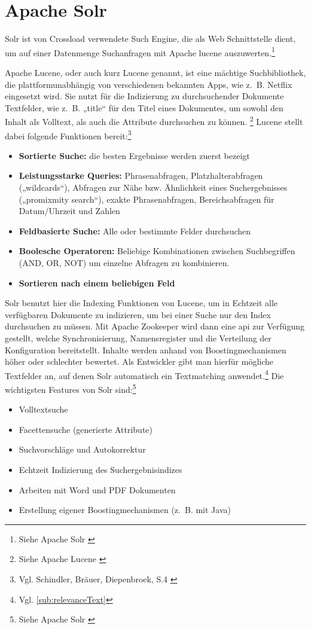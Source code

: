 \clearpage
\section{Apache Solr}
\label{sec:Solr}
Solr ist von Crossload verwendete Such Engine, die als Web Schnittstelle dient, um auf einer Datenmenge Suchanfragen mit Apache \gls{lucene} auszuwerten.\footnote{Siehe Apache Solr \cite{solr2022}}

Apache Lucene, oder auch kurz Lucene genannt, ist eine mächtige Suchbibliothek, die plattformunabhängig von verschiedenen bekannten Apps, wie z. B. Netflix eingesetzt wird.
Sie nutzt für die Indizierung zu durchsuchender Dokumente Textfelder, wie z. B. „title“ für den Titel eines Dokumentes, um sowohl den Inhalt als Volltext, als auch die Attribute durchsuchen zu können. \footnote{Siehe Apache Lucene \cite{lucene2022}}
Lucene stellt dabei folgende Funktionen bereit:\footnote{Vgl. Schindler, Bräuer, Diepenbroek, S.4 \cite{schindler2007}}
\begin{itemize}
  \item \textbf{Sortierte Suche:} die besten Ergebnisse werden zuerst bezeigt
  \item \textbf{Leistungsstarke Queries:} Phrasenabfragen, Platzhalterabfragen („wildcards“), Abfragen zur Nähe bzw. Ähnlichkeit eines Suchergebnisses („promixmity search“), exakte Phrasenabfragen, Bereichsabfragen für Datum/Uhrzeit und Zahlen
  \item \textbf{Feldbasierte Suche:} Alle oder bestimmte Felder durchsuchen
  \item \textbf{Boolesche Operatoren:} Beliebige Kombinationen zwischen Suchbegriffen (AND, OR,
  NOT) um einzelne Abfragen zu kombinieren.
  \item \textbf{Sortieren nach einem beliebigen Feld}
\end{itemize}

Solr benutzt hier die Indexing Funktionen von Lucene, um in Echtzeit alle verfügbaren Dokumente zu indizieren, um bei einer Suche nur den Index durchsuchen zu müssen.
Mit Apache Zookeeper wird dann eine \gls{api} zur Verfügung gestellt, welche Synchronisierung, Namensregister und die Verteilung der Konfiguration bereitstellt.
Inhalte werden anhand von Boostingmechanismen höher oder schlechter bewertet.
Als Entwickler gibt man hierfür mögliche Textfelder an, auf denen Solr automatisch ein Textmatching anwendet.\footnote{Vgl. \ref{sub:relevanceText}}
Die wichtigsten Features von Solr sind:\footnote{Siehe Apache Solr \cite{solr2022}}
\begin{itemize}
  \item Volltextsuche
  \item Facettensuche (generierte Attribute)
  \item Suchvorschläge und Autokorrektur
  \item Echtzeit Indizierung des Suchergebnisindizes
  \item Arbeiten mit Word und PDF Dokumenten
  \item Erstellung eigener Boostingmechanismen (z. B. mit Java)
\end{itemize}


